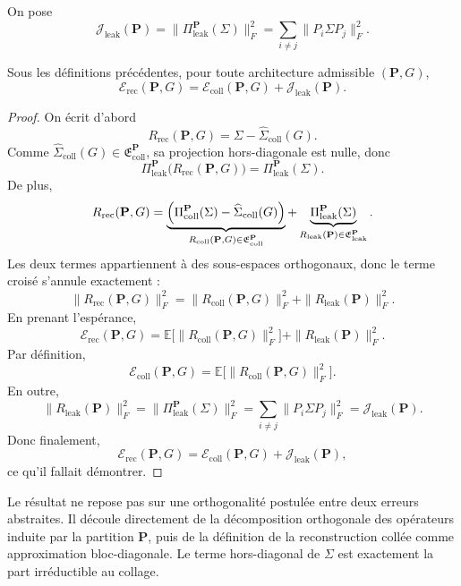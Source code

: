 \begin{definition}
On pose
\[
\mathcal J_{\mathrm{leak}}(\mathbf P)
=
\bigl\|\Pi_{\mathrm{leak}}^{\mathbf P}(\Sigma)\bigr\|_F^2
=
\sum_{i\neq j}\|P_i\Sigma P_j\|_F^2.
\]
\end{definition}

\begin{theorem}
Sous les définitions précédentes, pour toute architecture admissible \((\mathbf P,G)\),
\[
\mathcal E_{\mathrm{rec}}(\mathbf P,G)
=
\mathcal E_{\mathrm{coll}}(\mathbf P,G)
+
\mathcal J_{\mathrm{leak}}(\mathbf P).
\]
\end{theorem}

\begin{proof}
On écrit d'abord
\[
R_{\mathrm{rec}}(\mathbf P,G)
=
\Sigma-\widehat \Sigma_{\mathrm{coll}}(G).
\]
Comme \(\widehat \Sigma_{\mathrm{coll}}(G)\in \mathfrak E_{\mathrm{coll}}^{\mathbf P}\), sa projection hors-diagonale est nulle, donc
\[
\Pi_{\mathrm{leak}}^{\mathbf P}\!\bigl(R_{\mathrm{rec}}(\mathbf P,G)\bigr)
=
\Pi_{\mathrm{leak}}^{\mathbf P}(\Sigma).
\]
De plus,
\[
R_{\mathrm{rec}}(\mathbf P,G)
=
\underbrace{\Bigl(\Pi_{\mathrm{coll}}^{\mathbf P}(\Sigma)-\widehat \Sigma_{\mathrm{coll}}(G)\Bigr)}_{R_{\mathrm{coll}}(\mathbf P,G)\in\mathfrak E_{\mathrm{coll}}^{\mathbf P}}
+
\underbrace{\Pi_{\mathrm{leak}}^{\mathbf P}(\Sigma)}_{R_{\mathrm{leak}}(\mathbf P)\in\mathfrak E_{\mathrm{leak}}^{\mathbf P}}.
\]
Les deux termes appartiennent à des sous-espaces orthogonaux, donc le terme croisé s'annule exactement :
\[
\|R_{\mathrm{rec}}(\mathbf P,G)\|_F^2
=
\|R_{\mathrm{coll}}(\mathbf P,G)\|_F^2
+
\|R_{\mathrm{leak}}(\mathbf P)\|_F^2.
\]
En prenant l'espérance,
\[
\mathcal E_{\mathrm{rec}}(\mathbf P,G)
=
\mathbb E\bigl[\|R_{\mathrm{coll}}(\mathbf P,G)\|_F^2\bigr]
+
\|R_{\mathrm{leak}}(\mathbf P)\|_F^2.
\]
Par définition,
\[
\mathcal E_{\mathrm{coll}}(\mathbf P,G)
=
\mathbb E\bigl[\|R_{\mathrm{coll}}(\mathbf P,G)\|_F^2\bigr].
\]
En outre,
\[
\|R_{\mathrm{leak}}(\mathbf P)\|_F^2
=
\bigl\|\Pi_{\mathrm{leak}}^{\mathbf P}(\Sigma)\bigr\|_F^2
=
\sum_{i\neq j}\|P_i\Sigma P_j\|_F^2
=
\mathcal J_{\mathrm{leak}}(\mathbf P).
\]
Donc finalement,
\[
\mathcal E_{\mathrm{rec}}(\mathbf P,G)
=
\mathcal E_{\mathrm{coll}}(\mathbf P,G)
+
\mathcal J_{\mathrm{leak}}(\mathbf P),
\]
ce qu'il fallait démontrer.
\end{proof}

\begin{remark}
Le résultat ne repose pas sur une orthogonalité postulée entre deux erreurs abstraites.
Il découle directement de la décomposition orthogonale des opérateurs induite par la partition \(\mathbf P\),
puis de la définition de la reconstruction collée comme approximation bloc-diagonale.
Le terme hors-diagonal de \(\Sigma\) est exactement la part irréductible au collage.
\end{remark}

